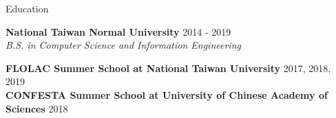 \documentclass{resume} %
\begin{document}

\begin{rSection}{Education}

{\bf National Taiwan Normal University} \hfill {2014 - 2019} \\
{\em B.S. in Computer Science and Information Engineering}

{\bf FLOLAC Summer School at National Taiwan University} \hfill {2017, 2018, 2019} \\
{\bf CONFESTA Summer School at University of Chinese Academy of Sciences} \hfill {2018}

\end{rSection}

\end{document}
